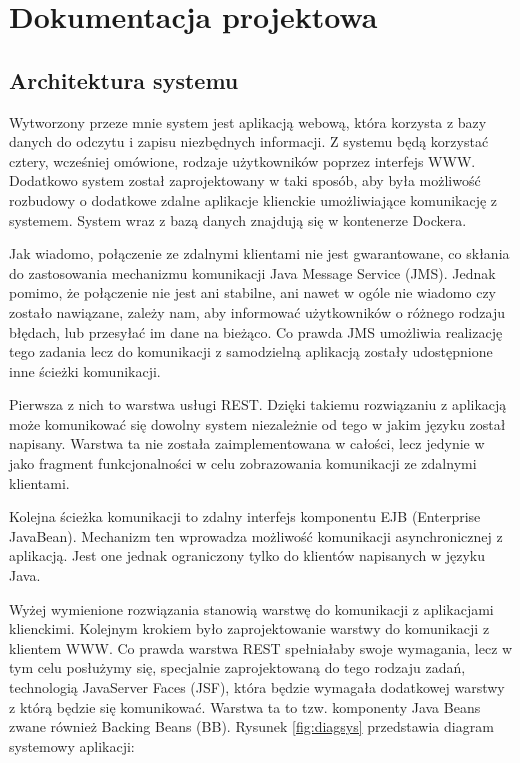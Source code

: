 \chapter{Dokumentacja projektowa}

\section{Architektura systemu}
Wytworzony przeze mnie system jest aplikacją webową, która korzysta z bazy danych do odczytu i zapisu niezbędnych informacji. Z systemu będą korzystać cztery, wcześniej omówione, rodzaje użytkowników poprzez interfejs WWW. Dodatkowo system został zaprojektowany w taki sposób, aby była możliwość rozbudowy o dodatkowe zdalne aplikacje klienckie umożliwiające komunikację z systemem. System wraz z bazą danych znajdują się w kontenerze Dockera.

Jak wiadomo, połączenie ze zdalnymi klientami nie jest gwarantowane, co skłania do zastosowania mechanizmu komunikacji Java Message Service (JMS). Jednak pomimo, że połączenie nie jest ani stabilne, ani nawet w ogóle nie wiadomo czy zostało nawiązane, zależy nam, aby informować użytkowników o różnego rodzaju błędach, lub przesyłać im dane na bieżąco. Co prawda JMS umożliwia realizację tego zadania lecz do komunikacji z samodzielną aplikacją zostały udostępnione inne ścieżki komunikacji. 

Pierwsza z nich to warstwa usługi REST. Dzięki takiemu rozwiązaniu z aplikacją może komunikować się dowolny system niezależnie od tego w jakim języku został napisany. Warstwa ta nie została zaimplementowana w całości, lecz jedynie w jako fragment funkcjonalności w celu zobrazowania komunikacji ze zdalnymi klientami.

Kolejna ścieżka komunikacji to zdalny interfejs komponentu EJB (Enterprise JavaBean). Mechanizm ten wprowadza możliwość komunikacji asynchronicznej z aplikacją. Jest one jednak ograniczony tylko do klientów napisanych w języku Java.

Wyżej wymienione rozwiązania stanowią warstwę do komunikacji z aplikacjami klienckimi. Kolejnym krokiem było zaprojektowanie warstwy do komunikacji z klientem WWW. Co prawda warstwa REST spełniałaby swoje wymagania, lecz w tym celu posłużymy się, specjalnie zaprojektowaną do tego rodzaju zadań, technologią JavaServer Faces (JSF), która będzie wymagała dodatkowej warstwy z którą będzie się komunikować. Warstwa ta to tzw. komponenty Java Beans zwane również Backing Beans (BB). Rysunek \ref{fig:diagsys} przedstawia diagram systemowy aplikacji:

